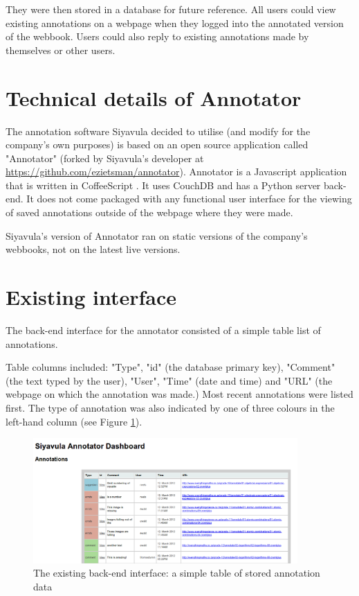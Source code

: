 They were then stored in a database for future reference. All users could view existing annotations on a webpage when they logged into the annotated version of the webbook. Users could also reply to existing annotations made by themselves or other users.

\section{Technical details of Annotator}
The annotation software Siyavula decided to utilise (and modify for the company's own purposes) is based on an open source application called "Annotator" \citep{Annotator} (forked by Siyavula's developer at \href{https://github.com/ezietsman/annotator}{https://github.com/ezietsman/annotator}). Annotator is a Javascript application that is written in CoffeeScript \citep{CoffeeScript}. It uses CouchDB \citep{CouchDB} and has a Python server back-end. It does not come packaged with any functional user interface for the viewing of saved annotations outside of the webpage where they were made.

Siyavula's version of Annotator ran on static versions of the company's webbooks, not on the latest live versions.

\section{Existing interface}
The back-end interface for the annotator consisted of a simple table list of annotations.

Table columns included: "Type", "id" (the database primary key), "Comment" (the text typed by the user), "User", "Time" (date and time) and "URL" (the webpage on which the annotation was made.) Most recent annotations were listed first. The type of annotation was also indicated by one of three colours in the left-hand column (see Figure \ref{fig:ExistingBackEnd}).
\begin{figure}
       \centering
    \includegraphics[width=0.9\textwidth]{Figures/annotator-backend-table.png}
 \caption{The existing back-end interface: a simple table of stored annotation data}
 \label{fig:ExistingBackEnd}
\end{figure}

